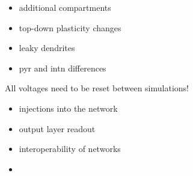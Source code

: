 \begin{itemize}
  \item additional compartments
  \item top-down plasticity changes
  \item leaky dendrites
  \item pyr and intn differences
\end{itemize}


All voltages need to be reset between simulations!

\begin{itemize}
  \item injections into the network
  \item output layer readout
  \item interoperability of networks
  \item

\end{itemize}

